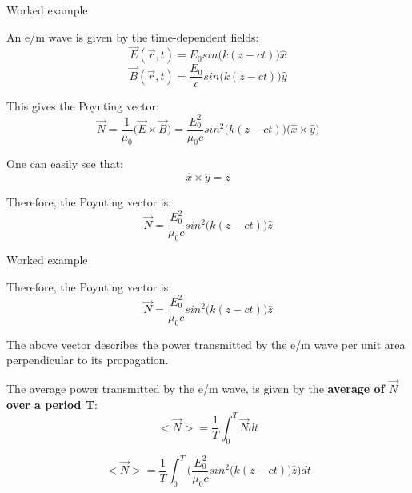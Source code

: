 %
%

{
\problemslide

%
%
%
%

\begin{frame}{Worked example}

An e/m wave is given by the time-dependent fields:
\begin{equation*}
  \vec{E}(\vec{r},t) = E_0 sin\Big( k(z-ct) \Big) \hat{x}
\end{equation*}
\begin{equation*}
  \vec{B}(\vec{r},t) = \frac{E_0}{c} sin\Big( k(z-ct) \Big) \hat{y}
\end{equation*}

This gives the Poynting vector:
\begin{equation*}
  \vec{N} =
    \frac{1}{\mu_0} \Big( \vec{E} \times \vec{B} \Big) =
    \frac{E_0^2}{\mu_0 c} sin^{2}\Big( k(z-ct) \Big) \Big( \hat{x} \times \hat{y} \Big)
\end{equation*}

One can easily see that:
\begin{equation*}
  \hat{x} \times \hat{y} = \hat{z}
\end{equation*}

Therefore, the Poynting vector is:
\begin{equation*}
  \vec{N} =
    \frac{E_0^2}{\mu_0 c} sin^{2}\Big( k(z-ct) \Big) \hat{z}
\end{equation*}

\end{frame}

%
%
%
%

\begin{frame}{Worked example}

Therefore, the Poynting vector is:
\begin{equation*}
  \vec{N} =
    \frac{E_0^2}{\mu_0 c} sin^{2}\Big( k(z-ct) \Big) \hat{z}
\end{equation*}

The above vector describes the  power transmitted by the e/m wave
per unit area perpendicular to its propagation.

The average power transmitted by the e/m wave, is given by
the {\bf average of $\vec{N}$ over a period T}:
\begin{equation*}
  <\vec{N}> = \frac{1}{T} \int_{0}^{T} \vec{N} dt
\end{equation*}

\begin{equation*}
  <\vec{N}> = \frac{1}{T} \int_{0}^{T} \Big( \frac{E_0^2}{\mu_0 c} sin^{2}\Big( k(z-ct) \Big) \hat{z} \Big) dt
\end{equation*}


\end{frame}}
